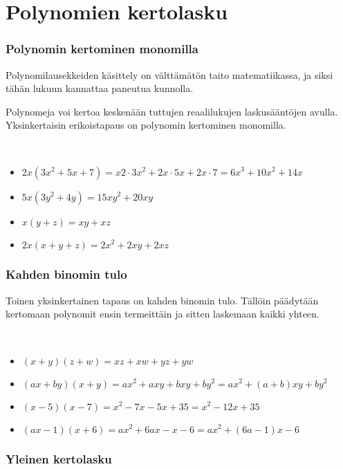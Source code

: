 \chapter{Polynomien kertolasku}

\subsection*{Polynomin kertominen monomilla}

Polynomilausekkeiden käsittely on välttämätön taito matematiikassa, ja siksi tähän lukuun kannattaa paneutua kunnolla.

Polynomeja voi kertoa keskenään tuttujen reaalilukujen laskusääntöjen avulla. Yksinkertaisin erikoistapaus on polynomin kertominen monomilla.

\begin{esimerkki}
\qquad \\
\begin{itemize}
    \item $2x(3x^2+5x+7) = x2\cdot 3x^2+2x\cdot 5x+2x\cdot 7=6x^3+10x^2+14x$
    \item $5x(3y^2+4y) = 15xy^2+20xy$
    \item $x(y+z) = xy+xz$
    \item $2x(x+y+z) = 2x^2+2xy+2xz$
\end{itemize}
\end{esimerkki}

\subsection*{Kahden binomin tulo}

Toinen yksinkertainen tapaus on kahden binomin tulo. Tällöin päädytään kertomaan polynomit ensin termeittäin ja sitten laskemaan kaikki yhteen.

\begin{esimerkki}
\qquad \\
\begin{itemize}
    \item $(x+y)(z+w) = xz+xw+yz+yw$
    \item $(ax+by)(x+y) = ax^2+axy+bxy+by^2 = ax^2+(a+b)xy+by^2$
    \item $(x-5)(x-7) = x^2-7x-5x+35 = x^2-12x+35$
    \item $(ax-1)(x+6) = ax^2+6ax-x-6 = ax^2+(6a-1)x-6$
\end{itemize}
\end{esimerkki}

\subsection*{Yleinen kertolasku}

